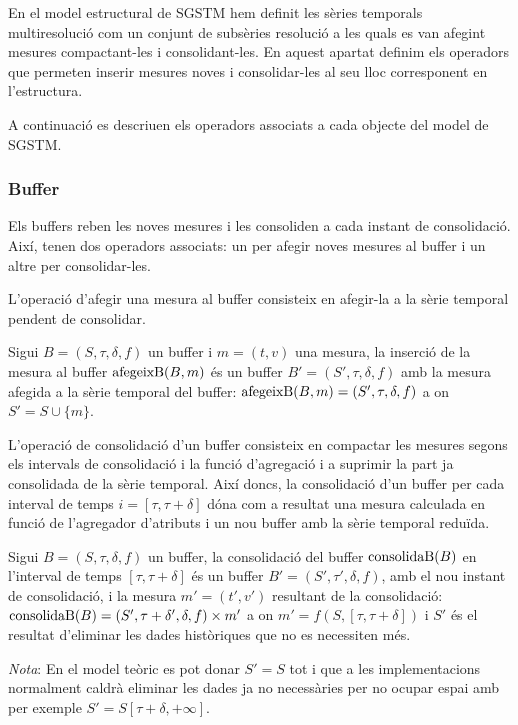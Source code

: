 En el model estructural de SGSTM hem definit les sèries temporals
multiresolució com un conjunt de subsèries resolució a les quals es
van afegint mesures compactant-les i consolidant-les. En aquest
apartat definim els operadors que permeten inserir mesures noves i
consolidar-les al seu lloc corresponent en l'estructura.

A continuació es descriuen els operadors associats a cada objecte del
model de SGSTM.


\subsubsection{Buffer}

Els buffers reben les noves mesures i les consoliden a cada instant de
consolidació. Així, tenen dos operadors associats: un per afegir noves
mesures al buffer i un altre per consolidar-les.


L'operació d'afegir una mesura al buffer consisteix en afegir-la a la
sèrie temporal pendent de consolidar.
\begin{definition}
  Sigui $B=(S,\tau,\delta,f)$ un buffer i $m=(t,v)$ una mesura, la
  inserció de la mesura al buffer $\operatorname*{afegeixB}(B,m)$ és un buffer
  $B'=(S',\tau,\delta,f)$ amb la mesura afegida a la sèrie temporal
  del buffer: $\operatorname*{afegeixB}(B,m) = (S',\tau,\delta,f)$ a on $S'=S\cup \{m\}$.
\end{definition}


L'operació de consolidació d'un buffer consisteix en compactar les
mesures segons els intervals de consolidació i la funció d'agregació i
a suprimir la part ja consolidada de la sèrie temporal.  Així doncs,
la consolidació d'un buffer per cada interval de temps
$i=[\tau,\tau+\delta]$ dóna com a resultat una mesura calculada en
funció de l'agregador d'atributs i un nou buffer amb la sèrie temporal
reduïda.
\begin{definition}\label{def:model:consolidacio-buffer}
  Sigui $B=(S,\tau,\delta,f)$ un buffer, la consolidació del buffer
  $\operatorname*{consolidaB}(B)$ en l'interval de temps $[\tau,\tau+\delta]$ és un
  buffer $B'=(S',\tau',\delta,f)$, amb el nou instant de consolidació,
  i la mesura $m'=(t',v')$ resultant de la consolidació: $\operatorname*{consolidaB}(B) =
  (S',\tau+\delta',\delta,f) \times m'$ a on
  $m'=f(S,[\tau,\tau+\delta])$ i $S'$ és el resultat d'eliminar les
  dades històriques que no es necessiten més. 

  \emph{Nota}: En el model teòric es pot donar $S'=S$ tot i que a les
  implementacions normalment caldrà eliminar les dades ja no
  necessàries per no ocupar espai amb per exemple $S'=
  S[\tau+\delta,+\infty]$.
\end{definition}

